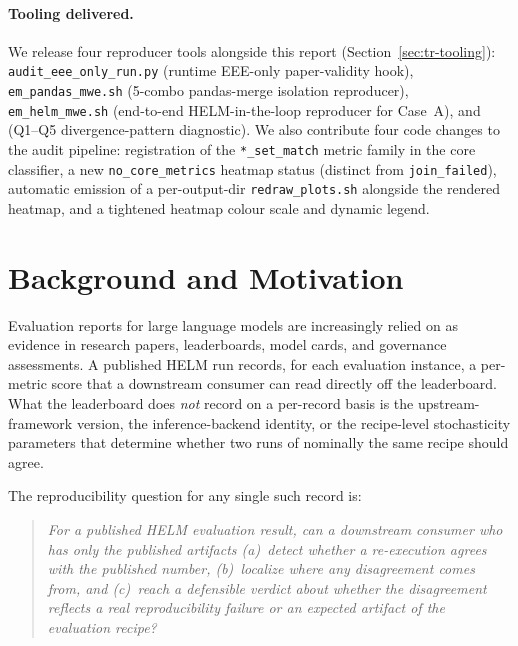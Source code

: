 \documentclass[11pt]{article}
\begin{document}
\paragraph{Tooling delivered.}
We release four reproducer tools alongside this report
  (Section~\ref{sec:tr-tooling}):
  \texttt{audit\_eee\_only\_run.py} (runtime EEE-only paper-validity
  hook),
  \texttt{em\_pandas\_mwe.sh} (5-combo pandas-merge isolation
  reproducer),
  \texttt{em\_helm\_mwe.sh} (end-to-end HELM-in-the-loop reproducer
  for Case~A),
  and  (Q1--Q5
  divergence-pattern diagnostic).
We also contribute four code changes to the audit pipeline:
  registration of the \texttt{*\_set\_match} metric family in the core
  classifier, a new \texttt{no\_core\_metrics} heatmap status
  (distinct from \texttt{join\_failed}), automatic emission of a
  per-output-dir \texttt{redraw\_plots.sh} alongside the rendered
  heatmap, and a tightened heatmap colour scale and dynamic legend.


\section{Background and Motivation}
\label{sec:tr-background}

Evaluation reports for large language models are increasingly relied
  on as evidence in research papers, leaderboards, model cards, and
  governance assessments.
A published HELM run records, for each evaluation instance, a
  per-metric score that a downstream consumer can read directly off
  the leaderboard.
What the leaderboard does \emph{not} record on a per-record basis is
  the upstream-framework version, the inference-backend identity, or
  the recipe-level stochasticity parameters that determine whether
  two runs of nominally the same recipe should agree.

The reproducibility question for any single such record is:

\begin{quote}\itshape
For a published HELM evaluation result, can a downstream consumer who
  has only the published artifacts (a)~detect whether a re-execution
  agrees with the published number, (b)~localize where any
  disagreement comes from, and (c)~reach a defensible verdict about
  whether the disagreement reflects a real reproducibility failure or
  an expected artifact of the evaluation recipe?
\end{quote}
\end{document}
